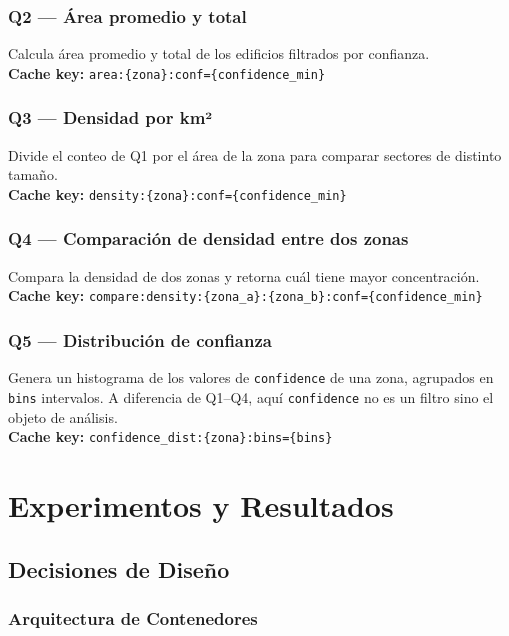 \documentclass[letter,12pt]{article}
\begin{document}
\subsubsection{Q2 --- Área promedio y total}
Calcula área promedio y total de los edificios filtrados por confianza.\\
\textbf{Cache key:} \texttt{area:\{zona\}:conf=\{confidence\_min\}}

\subsubsection{Q3 --- Densidad por km²}
Divide el conteo de Q1 por el área de la zona para comparar sectores de distinto tamaño.\\
\textbf{Cache key:} \texttt{density:\{zona\}:conf=\{confidence\_min\}}

\subsubsection{Q4 --- Comparación de densidad entre dos zonas}
Compara la densidad de dos zonas y retorna cuál tiene mayor concentración.\\
\textbf{Cache key:} \texttt{compare:density:\{zona\_a\}:\{zona\_b\}:conf=\{confidence\_min\}}

\subsubsection{Q5 --- Distribución de confianza}
Genera un histograma de los valores de \texttt{confidence} de una zona, agrupados en
\texttt{bins} intervalos. A diferencia de Q1--Q4, aquí \texttt{confidence} no es un
filtro sino el objeto de análisis.\\
\textbf{Cache key:} \texttt{confidence\_dist:\{zona\}:bins=\{bins\}}

\section{Experimentos y Resultados}

\subsection{Decisiones de Diseño}

\subsubsection{Arquitectura de Contenedores}
\end{document}
